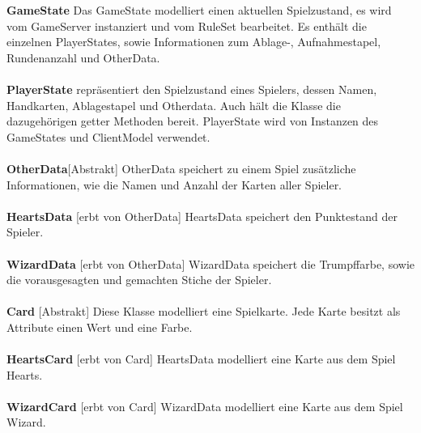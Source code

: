 \documentclass{article}
\begin{document}
		\textbf{GameState} Das GameState modelliert einen aktuellen Spielzustand, es wird vom GameServer instanziert und vom RuleSet bearbeitet. Es enthält die einzelnen PlayerStates, sowie Informationen zum Ablage-, Aufnahmestapel, Rundenanzahl und OtherData. \\ \\
		
		\textbf{PlayerState} repräsentiert den Spielzustand eines Spielers, dessen Namen, Handkarten, Ablagestapel und Otherdata. Auch hält die Klasse die dazugehörigen getter Methoden bereit. PlayerState wird von Instanzen des GameStates und ClientModel verwendet. \\ \\
		
		\textbf{OtherData}[Abstrakt] OtherData speichert zu einem Spiel zusätzliche Informationen, wie die Namen und Anzahl der Karten aller Spieler. \\ \\
		\textbf{HeartsData} [erbt von OtherData] HeartsData speichert den Punktestand der Spieler. \\ \\
		
		\textbf{WizardData} [erbt von OtherData] WizardData speichert die Trumpffarbe, sowie die vorausgesagten und gemachten Stiche der Spieler. \\ \\
		\textbf{Card} [Abstrakt] Diese Klasse modelliert eine Spielkarte. Jede Karte besitzt als Attribute einen Wert und eine Farbe. \\ \\
		\textbf{HeartsCard} [erbt von Card]  HeartsData modelliert eine Karte aus dem Spiel Hearts. \\ \\
		\textbf{WizardCard} [erbt von Card] WizardData modelliert eine Karte aus dem Spiel Wizard. \\ \\
\end{document}
